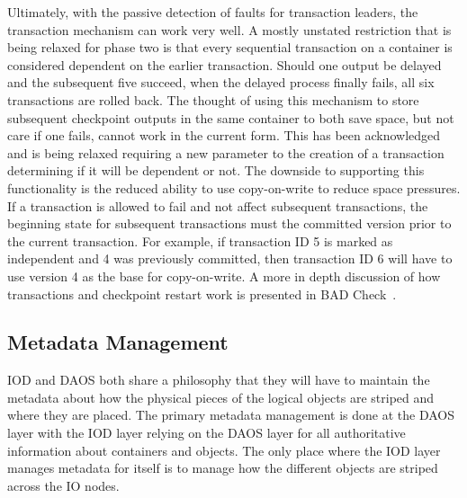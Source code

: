 \documentclass[conference]{IEEEtran} \pdfpagewidth=8.5in
\begin{document}
Ultimately, with the passive detection of faults for transaction leaders, the
transaction mechanism can work very well. A mostly unstated restriction that is
being relaxed for phase two is that every sequential transaction on a container
is considered dependent on the earlier transaction. Should one output be
delayed and the subsequent five succeed, when the delayed process finally
fails, all six transactions are rolled back. The thought of using this
mechanism to store subsequent checkpoint outputs in the same container to both
save space, but not care if one fails, cannot work in the current form. This
has been acknowledged and is being relaxed requiring a new parameter to the
creation of a transaction determining if it will be dependent or not. The
downside to supporting this functionality is the reduced ability to use
copy-on-write to reduce space pressures. If a transaction is allowed to fail
and not affect subsequent transactions, the beginning state for subsequent
transactions must the committed version prior to the current transaction. For
example, if transaction ID 5 is marked as independent and 4 was previously
committed, then transaction ID 6 will have to use version 4 as the base for
copy-on-write.  A more in depth discussion of how transactions and checkpoint
restart work is presented in BAD Check~\cite{bent:2015:pdsw}.

\subsection{Metadata Management}


IOD and DAOS both share a philosophy that they will have to maintain the
metadata about how the physical pieces of the logical objects are striped and
where they are placed. The primary metadata management is done at the DAOS
layer with the IOD layer relying on the DAOS layer for all authoritative
information about containers and objects. The only place where the IOD layer
manages metadata for itself is to manage how the different objects are striped
across the IO nodes.
\end{document}
